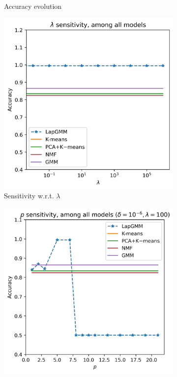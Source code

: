 \documentclass[10pt,journal,compsoc]{IEEEtran}
\begin{document}
\begin{figure}[!t]
\begin{subfigure}{.23\textwidth}
            \caption{Accuracy evolution}
            \label{fig:acc}
        \end{subfigure}
        \begin{subfigure}{.23\textwidth}
            \centering
            \includegraphics[width=\linewidth]{figures/lambda.png}  
            \caption{Sensitivity w.r.t. $\lambda$}
            \label{fig:lambda}
        \end{subfigure}
        \begin{subfigure}{.23\textwidth}
            \centering
            \includegraphics[width=\linewidth]{figures/p.png}  

\end{subfigure}
\end{figure}
\end{document}
